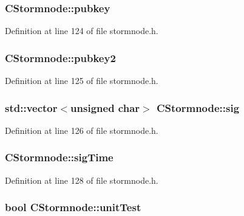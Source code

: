\subsubsection[{pubkey}]{ C\+Stormnode\+::pubkey}\label{class_c_stormnode_af241ab789726de5ba5d2caba082c3d01}


Definition at line 124 of file stormnode.\+h.

\hypertarget{class_c_stormnode_a43efb713c0d8e8f01b9ea593e025856b}{}
\subsubsection[{pubkey2}]{ C\+Stormnode\+::pubkey2}\label{class_c_stormnode_a43efb713c0d8e8f01b9ea593e025856b}


Definition at line 125 of file stormnode.\+h.

\hypertarget{class_c_stormnode_a7484d9ff7d908f3610f6946aba19a7b3}{}
\subsubsection[{sig}]{\setlength{\rightskip}{0pt plus 5cm}std\+::vector$<$unsigned char$>$ C\+Stormnode\+::sig}\label{class_c_stormnode_a7484d9ff7d908f3610f6946aba19a7b3}


Definition at line 126 of file stormnode.\+h.

\hypertarget{class_c_stormnode_ae77544488795272ca9615ed1e23d3b77}{}
\subsubsection[{sig\+Time}]{ C\+Stormnode\+::sig\+Time}\label{class_c_stormnode_ae77544488795272ca9615ed1e23d3b77}


Definition at line 128 of file stormnode.\+h.

\hypertarget{class_c_stormnode_a7e879cd7e4f39560cc846c5127a58afa}{}
\subsubsection[{unit\+Test}]{\setlength{\rightskip}{0pt plus 5cm}bool C\+Stormnode\+::unit\+Test}\label{class_c_stormnode_a7e879cd7e4f39560cc846c5127a58afa}



